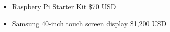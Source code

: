 \begin{itemize}
	\item Raspbery Pi Starter Kit \hfill \$70 USD
	\item Samsung 40-inch touch screen display \hfill \$1,200 USD
\end{itemize}